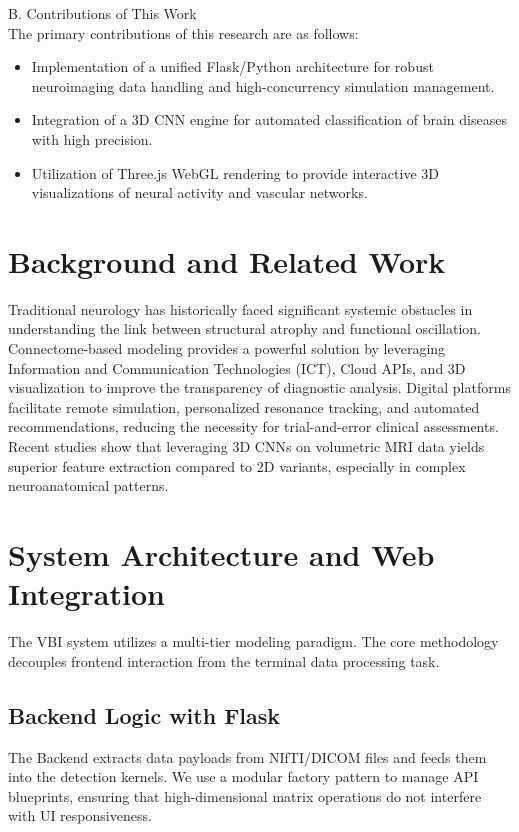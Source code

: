 \documentclass[conference]{IEEEtran}
\begin{document}
B. Contributions of This Work\\
The primary contributions of this research are as follows:
\begin{itemize}
    \item Implementation of a unified Flask/Python architecture for robust neuroimaging data handling and high-concurrency simulation management.
    \item Integration of a 3D CNN engine for automated classification of brain diseases with high precision.
    \item Utilization of Three.js WebGL rendering to provide interactive 3D visualizations of neural activity and vascular networks.
\end{itemize}

\section{Background and Related Work}
Traditional neurology has historically faced significant systemic obstacles in understanding the link between structural atrophy and functional oscillation. Connectome-based modeling provides a powerful solution by leveraging Information and Communication Technologies (ICT), Cloud APIs, and 3D visualization to improve the transparency of diagnostic analysis. Digital platforms facilitate remote simulation, personalized resonance tracking, and automated recommendations, reducing the necessity for trial-and-error clinical assessments. Recent studies show that leveraging 3D CNNs on volumetric MRI data yields superior feature extraction compared to 2D variants, especially in complex neuroanatomical patterns.

\section{System Architecture and Web Integration}
The VBI system utilizes a multi-tier modeling paradigm. The core methodology decouples frontend interaction from the terminal data processing task.

\subsection{Backend Logic with Flask}
The Backend extracts data payloads from NIfTI/DICOM files and feeds them into the detection kernels. We use a modular factory pattern to manage API blueprints, ensuring that high-dimensional matrix operations do not interfere with UI responsiveness.
\end{document}
